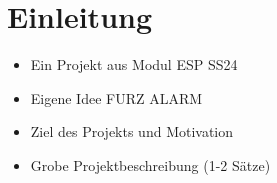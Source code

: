 \newpage
\section{Einleitung}
\begin{itemize}
    \item Ein Projekt aus Modul ESP SS24
    \item Eigene Idee FURZ ALARM
    \item Ziel des Projekts und Motivation
    \item Grobe Projektbeschreibung (1-2 Sätze)
\end{itemize}
    